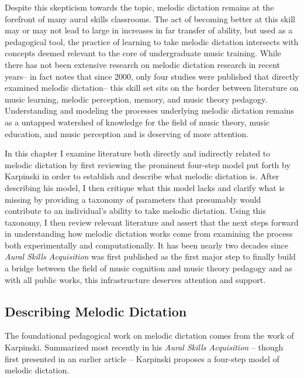\documentclass[]{book}
\begin{document}
Despite this skepticism towards the topic, melodic dictation remains at the forefront of many aural skills classrooms.
The act of becoming better at this skill may or may not lead to large in increases in far transfer of ability, but used as a pedagogical tool, the practice of learning to take melodic dictation intersects with concepts deemed relevant to the core of undergraduate music training.
While there has not been extensive research on melodic dictation research in recent years-- in fact \citet{paneyEffectDirectingAttention2016} notes that since 2000, only four studies were published that directly examined melodic dictation-- this skill set sits on the border between literature on music learning, melodic perception, memory, and music theory pedagogy.
Understanding and modeling the processes underlying melodic dictation remains as a untapped watershed of knowledge for the field of music theory, music education, and music perception and is deserving of more attention.

In this chapter I examine literature both directly and indirectly related to melodic dictation by first reviewing the prominent four-step model put forth by Karpinski in order to establish and describe what melodic dictation is.
After describing his model, I then critique what this model lacks and clarify what is missing by providing a taxonomy of parameters that presumably would contribute to an individual's ability to take melodic dictation.
Using this taxonomy, I then review relevant literature and assert that the next steps forward in understanding how melodic dictation works come from examining the process both experimentally and computationally.
It has been nearly two decades since \emph{Aural Skills Acquisition} was first published as the first major step to finally build a bridge between the field of music cognition and music theory pedagogy \citep{davidbutlerWhyGulfMusic1997a, karpinskiAuralSkillsAcquisition2000, klonoskiPerceptualLearningHierarchy2000} and as with all public works, this infrastructure deserves attention and support.

\hypertarget{describing-melodic-dictation}{%
\subsection{Describing Melodic Dictation}\label{describing-melodic-dictation}}

The foundational pedagogical work on melodic dictation comes from the work of Karpinski.
Summarized most recently in his \emph{Aural Skills Acquisition} \citep{karpinskiAuralSkillsAcquisition2000}-- though first presented in an earlier article \citep{karpinskiModelMusicPerception1990}-- Karpinski proposes a four-step model of melodic dictation.
\end{document}
